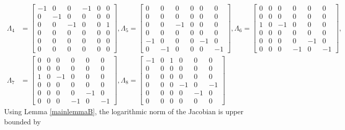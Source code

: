 \documentclass[onefignum,onetabnum]{siamonline220329}
\begin{document}
{{\begin{align*}
\Lambda_4&=\left[\begin{array}{cccccc} -1 & 0 & 0 & -1 & 0 & 0\\ 0 & -1 & 0 & 0 & 0 & 0\\ 0 & 0 & -1 & 0 & 0 & 1\\ 0 & 0 & 0 & 0 & 0 & 0\\ 0 & 0 & 0 & 0 & 0 & 0\\ 0 & 0 & 0 & 0 & 0 & 0 \end{array}\right],
\Lambda_5=\left[\begin{array}{cccccc} 0 & 0 & 0 & 0 & 0 & 0\\ 0 & 0 & 0 & 0 & 0 & 0\\ 0 & 0 & -1 & 0 & 0 & 0\\ 0 & 0 & 0 & 0 & 0 & 0\\ -1 & 0 & 0 & 0 & -1 & 0\\ 0 & -1 & 0 & 0 & 0 & -1 \end{array}\right],
\Lambda_6=\left[\begin{array}{cccccc} 0 & 0 & 0 & 0 & 0 & 0\\ 0 & 0 & 0 & 0 & 0 & 0\\ 1 & 0 & -1 & 0 & 0 & 0\\ 0 & 0 & 0 & 0 & 0 & 0\\ 0 & 0 & 0 & 0 & -1 & 0\\ 0 & 0 & 0 & -1 & 0 & -1 \end{array}\right], \\
\Lambda_7&=\left[\begin{array}{cccccc} 0 & 0 & 0 & 0 & 0 & 0\\ 0 & 0 & 0 & 0 & 0 & 0\\ 1 & 0 & -1 & 0 & 0 & 0\\ 0 & 0 & 0 & 0 & 0 & 0\\ 0 & 0 & 0 & 0 & -1 & 0\\ 0 & 0 & 0 & -1 & 0 & -1 \end{array}\right],
\Lambda_8=\left[\begin{array}{cccccc} -1 & 0 & 1 & 0 & 0 & 0\\ 0 & 0 & 0 & 0 & 0 & 0\\ 0 & 0 & 0 & 0 & 0 & 0\\ 0 & 0 & 0 & -1 & 0 & -1\\ 0 & 0 & 0 & 0 & -1 & 0\\ 0 & 0 & 0 & 0 & 0 & 0 \end{array}\right]
\end{align*}
}
Using Lemma \ref{mainlemmaB}, the logarithmic norm of the Jacobian is upper bounded by 
}
\end{document}
